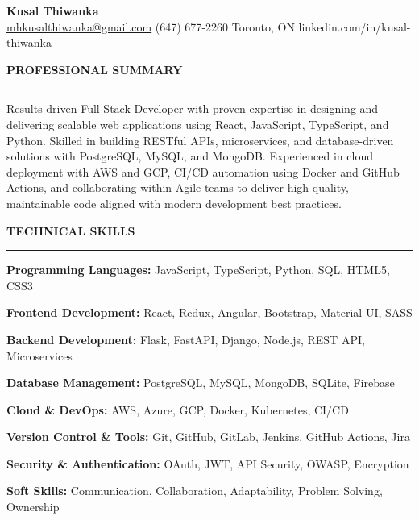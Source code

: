 \documentclass[10pt,letterpaper]{article}
\begin{document}
\begin{center}
{\LARGE\textbf{Kusal Thiwanka}}\\[3pt]
\href{mailto:mhkusalthiwanka@gmail.com}{mhkusalthiwanka@gmail.com}\hspace{2em}%
(647) 677{-}2260\hspace{2em}%
Toronto, ON\hspace{2em}
linkedin.com/in/kusal-thiwanka
\end{center}

\vspace{6pt}

\textbf{PROFESSIONAL SUMMARY}\\[-8pt]
\noindent\rule{\textwidth}{1pt}

\vspace{-2pt}

Results-driven Full Stack Developer with proven expertise in designing and delivering scalable web applications using React, JavaScript, TypeScript, and Python. Skilled in building RESTful APIs, microservices, and database-driven solutions with PostgreSQL, MySQL, and MongoDB. Experienced in cloud deployment with AWS and GCP, CI/CD automation using Docker and GitHub Actions, and collaborating within Agile teams to deliver high-quality, maintainable code aligned with modern development best practices.

\vspace{8pt}

\textbf{TECHNICAL SKILLS}\\[-8pt]
\noindent\rule{\textwidth}{1pt}

\vspace{-2pt}

\textbf{Programming Languages:} JavaScript, TypeScript, Python, SQL, HTML5, CSS3

\textbf{Frontend Development:} React, Redux, Angular, Bootstrap, Material UI, SASS

\textbf{Backend Development:} Flask, FastAPI, Django, Node.js, REST API, Microservices

\textbf{Database Management:} PostgreSQL, MySQL, MongoDB, SQLite, Firebase

\textbf{Cloud \& DevOps:} AWS, Azure, GCP, Docker, Kubernetes, CI/CD

\textbf{Version Control \& Tools:} Git, GitHub, GitLab, Jenkins, GitHub Actions, Jira

\textbf{Security \& Authentication:} OAuth, JWT, API Security, OWASP, Encryption

\textbf{Soft Skills:} Communication, Collaboration, Adaptability, Problem Solving, Ownership
\end{document}
